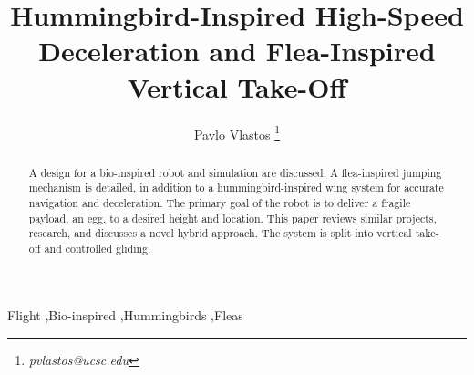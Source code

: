 \documentclass[preprint,authoryear,12pt] {elsarticle}
\begin{document}
\begin{frontmatter}

\title{Hummingbird-Inspired High-Speed Deceleration and Flea-Inspired Vertical Take-Off} 

\author{Pavlo Vlastos \footnote{\textit{pvlastos@ucsc.edu}}}

\address{Baskin School of Engineering, UC Santa Cruz}

%
%
\begin{abstract} 
A design for a bio-inspired robot and simulation are discussed. A flea-inspired jumping mechanism is detailed, in addition to a hummingbird-inspired wing system for accurate navigation and deceleration. The primary goal of the robot is to deliver a fragile payload, an egg, to a desired height and location. This paper reviews similar projects, research, and discusses a novel hybrid approach. The system is split into vertical take-off and controlled gliding.\\
\end{abstract}

\begin{keyword}
Flight \sep Bio-inspired \sep Hummingbirds \sep Fleas
\end{keyword}

\end{frontmatter}



 	
 
 		
 	





\end{document}
